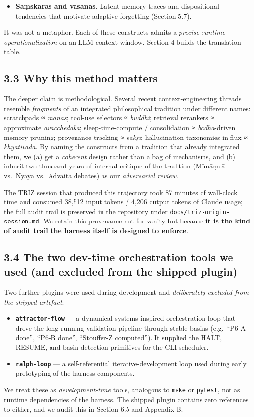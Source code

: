 \begin{itemize}
\item
  \textbf{Saṃskāras and vāsanās}. Latent memory traces and dispositional tendencies \citep{deutsch1969advaita, sankaraupadesha, halbfass1991traditioncomparison} that motivate adaptive forgetting (Section 5.7).
\end{itemize}

It was not a metaphor. Each of these constructs admits a \emph{precise runtime operationalization} on an LLM context window. Section 4 builds the translation table.

\subsection{3.3 Why this method matters}\label{why-this-method-matters}

The deeper claim is methodological. Several recent context-engineering threads resemble \emph{fragments} of an integrated philosophical tradition under different names: scratchpads ≈ \emph{manas}; tool-use selectors ≈ \emph{buddhi}; retrieval rerankers ≈ approximate \emph{avacchedaka}; sleep-time-compute / consolidation ≈ \emph{bādha}-driven memory pruning; provenance tracking ≈ \emph{sākṣī}; hallucination taxonomies in flux ≈ \emph{khyātivāda}. By naming the constructs from a tradition that already integrated them, we (a) get a \emph{coherent} design rather than a bag of mechanisms, and (b) inherit two thousand years of internal critique of the tradition (Mīmāṃsā vs.~Nyāya vs.~Advaita debates) as our \emph{adversarial review}.

The TRIZ session that produced this trajectory took 87 minutes of wall-clock time and consumed 38,512 input tokens / 4,206 output tokens of Claude usage; the full audit trail is preserved in the repository under \texttt{docs/triz-origin-session.md}. We retain this provenance not for vanity but because \textbf{it is the kind of audit trail the harness itself is designed to enforce}.

\subsection{3.4 The two dev-time orchestration tools we used (and excluded from the shipped plugin)}\label{the-two-dev-time-orchestration-tools-we-used-and-excluded-from-the-shipped-plugin}

Two further plugins were used during development and \emph{deliberately excluded from the shipped artefact}:

\begin{itemize}
\item
  \textbf{\texttt{attractor-flow}} \citep{attractorflowplugin} --- a dynamical-systems-inspired orchestration loop that drove the long-running validation pipeline through stable basins (e.g.~``P6-A done'', ``P6-B done'', ``Stouffer-Z computed''). It supplied the HALT, RESUME, and basin-detection primitives for the CLI scheduler.
\item
  \textbf{\texttt{ralph-loop}} --- a self-referential iterative-development loop used during early prototyping of the harness components.
\end{itemize}

We treat these as \emph{development-time} tools, analogous to \texttt{make} or \texttt{pytest}, not as runtime dependencies of the harness. The shipped plugin contains zero references to either, and we audit this in Section 6.5 and Appendix B.
